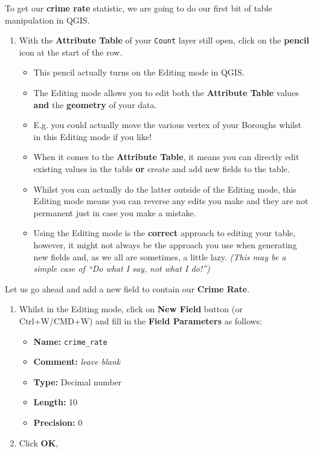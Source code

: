 \documentclass[
]{book}
\providecommand{\tightlist}{%
  \setlength{\itemsep}{0pt}\setlength{\parskip}{0pt}}
\begin{document}
To get our \textbf{crime rate} statistic, we are going to do our first bit of table manipulation in QGIS.

\begin{enumerate}
\def\labelenumi{\arabic{enumi}.}
\setcounter{enumi}{5}
\tightlist
\item
  With the \textbf{Attribute Table} of your \texttt{Count} layer still open, click on the \textbf{pencil} icon at the start of the row.

  \begin{itemize}
  \tightlist
  \item
    This pencil actually turns on the Editing mode in QGIS.
  \item
    The Editing mode allows you to edit both the \textbf{Attribute Table} values \textbf{and} the \textbf{geometry} of your data.
  \item
    E.g. you could actually move the various vertex of your Boroughs whilst in this Editing mode if you like!
  \item
    When it comes to the \textbf{Attribute Table}, it means you can directly edit existing values in the table \textbf{or} create and add new fields to the table.
  \item
    Whilst you can actually do the latter outside of the Editing mode, this Editing mode means you can reverse any edits you make and they are not permanent just in case you make a mistake.
  \item
    Using the Editing mode is the \textbf{correct} approach to editing your table, however, it might not always be the approach you use when generating new fields and, as we all are sometimes, a little lazy. \emph{(This may be a simple case of ``Do what I say, not what I do!'')}
  \end{itemize}
\end{enumerate}

Let us go ahead and add a new field to contain our \textbf{Crime Rate}.

\begin{enumerate}
\def\labelenumi{\arabic{enumi}.}
\setcounter{enumi}{6}
\tightlist
\item
  Whilst in the Editing mode, click on \textbf{New Field} button (or Ctrl+W/CMD+W) and fill in the \textbf{Field Parameters} as follows:

  \begin{itemize}
  \tightlist
  \item
    \textbf{Name:} \texttt{crime\_rate}
  \item
    \textbf{Comment:} \emph{leave blank}
  \item
    \textbf{Type:} Decimal number
  \item
    \textbf{Length:} 10
  \item
    \textbf{Precision:} 0
  \end{itemize}
\item
  Click \textbf{OK},
\end{enumerate}
\end{document}
